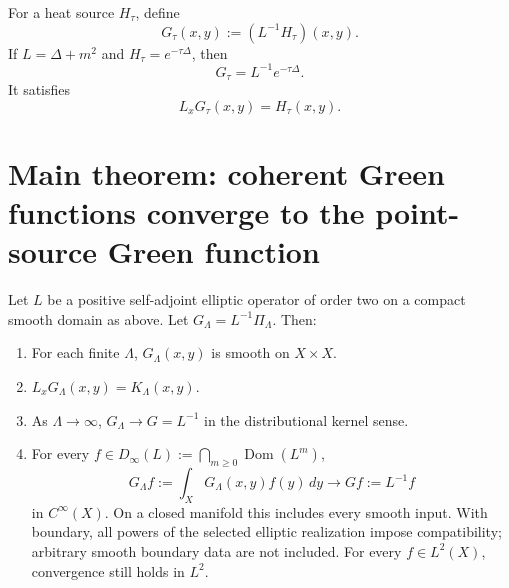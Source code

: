 \documentclass[11pt]{article}
\begin{document}
\begin{definition}
For a heat source \(H_\tau\), define
\begin{equation}
G_\tau(x,y):=(L^{-1}H_\tau)(x,y).
\end{equation}
If \(L=\Delta+m^2\) and \(H_\tau=e^{-\tau\Delta}\), then
\begin{equation}
G_\tau = L^{-1}e^{-\tau\Delta}.
\end{equation}
It satisfies
\begin{equation}
L_xG_\tau(x,y)=H_\tau(x,y).
\end{equation}
\end{definition}

\section{Main theorem: coherent Green functions converge to the point-source Green function}

\begin{theorem}
Let \(L\) be a positive self-adjoint elliptic operator of order two on a compact smooth domain as above. Let \(G_\Lambda=L^{-1}\Pi_\Lambda\). Then:
\begin{enumerate}
\item For each finite \(\Lambda\), \(G_\Lambda(x,y)\) is smooth on \(X\times X\).
\item \(L_xG_\Lambda(x,y)=K_\Lambda(x,y)\).
\item As \(\Lambda\to\infty\), \(G_\Lambda\to G=L^{-1}\) in the distributional kernel sense.
\item For every \(f\in D_\infty(L):=\bigcap_{m\ge0}\operatorname{Dom}(L^m)\),
\[
G_\Lambda f:=\int_XG_\Lambda(x,y)f(y)\,dy
\longrightarrow
Gf:=L^{-1}f
\]
in \(C^\infty(X)\). On a closed manifold this includes every smooth
input. With boundary, all powers of the selected elliptic realization
impose compatibility; arbitrary smooth boundary data are not included.
For every \(f\in L^2(X)\), convergence still holds in \(L^2\).
\end{enumerate}
\end{theorem}
\end{document}
